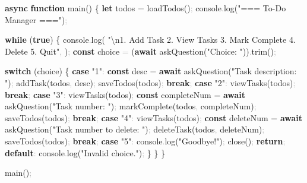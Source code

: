 \documentclass[
  justified,
  openright,
]{tufte-book}
\newcommand{\KeywordTok}[1]{\textcolor{CodeKeyword}{\textbf{#1}}}  %
\newcommand{\StringTok}[1]{\textcolor{CodeString}{#1}}              %
\newcommand{\CodeFuncTok}[1]{\textcolor{CodeKeyword}{#1}}           %
\newcommand{\OperatorTok}[1]{\textcolor{DarkGray}{#1}}              %
\newenvironment{Shaded}{%
  \begin{mdframed}[style=TufteCode]%
}{%
  \end{mdframed}%
}
\begin{document}
\begin{Shaded}
\begin{Highlighting}[]
\KeywordTok{async} \KeywordTok{function} \CodeFuncTok{main}() \{
  \KeywordTok{let} todos \OperatorTok{=} \CodeFuncTok{loadTodos}()\OperatorTok{;}
  console\OperatorTok{.}\CodeFuncTok{log}(\StringTok{"=== To{-}Do Manager ==="})\OperatorTok{;}
 
  \KeywordTok{while} (\KeywordTok{true}) \{
    console\OperatorTok{.}\CodeFuncTok{log}(
      \StringTok{"}\StringTok{\textbackslash{}n}\StringTok{1. Add Task  2. View Tasks  3. Mark Complete  4. Delete  5. Quit"}\OperatorTok{,}
    )\OperatorTok{;}
    \KeywordTok{const} choice \OperatorTok{=} (\KeywordTok{await} \CodeFuncTok{askQuestion}(\StringTok{"Choice: "}))\OperatorTok{.}\CodeFuncTok{trim}()\OperatorTok{;}
 
    \KeywordTok{switch} (choice) \{
      \KeywordTok{case} \StringTok{"1"}\OperatorTok{:}
        \KeywordTok{const} desc \OperatorTok{=} \KeywordTok{await} \CodeFuncTok{askQuestion}(\StringTok{"Task description: "})\OperatorTok{;}
        \CodeFuncTok{addTask}(todos\OperatorTok{,} desc)\OperatorTok{;}
        \CodeFuncTok{saveTodos}(todos)\OperatorTok{;}
        \KeywordTok{break}\OperatorTok{;}
      \KeywordTok{case} \StringTok{"2"}\OperatorTok{:}
        \CodeFuncTok{viewTasks}(todos)\OperatorTok{;}
        \KeywordTok{break}\OperatorTok{;}
      \KeywordTok{case} \StringTok{"3"}\OperatorTok{:}
        \CodeFuncTok{viewTasks}(todos)\OperatorTok{;}
        \KeywordTok{const} completeNum \OperatorTok{=} \KeywordTok{await} \CodeFuncTok{askQuestion}(\StringTok{"Task number: "})\OperatorTok{;}
        \CodeFuncTok{markComplete}(todos\OperatorTok{,} completeNum)\OperatorTok{;}
        \CodeFuncTok{saveTodos}(todos)\OperatorTok{;}
        \KeywordTok{break}\OperatorTok{;}
      \KeywordTok{case} \StringTok{"4"}\OperatorTok{:}
        \CodeFuncTok{viewTasks}(todos)\OperatorTok{;}
        \KeywordTok{const} deleteNum \OperatorTok{=} \KeywordTok{await} \CodeFuncTok{askQuestion}(\StringTok{"Task number to delete: "})\OperatorTok{;}
        \CodeFuncTok{deleteTask}(todos\OperatorTok{,} deleteNum)\OperatorTok{;}
        \CodeFuncTok{saveTodos}(todos)\OperatorTok{;}
        \KeywordTok{break}\OperatorTok{;}
      \KeywordTok{case} \StringTok{"5"}\OperatorTok{:}
        console\OperatorTok{.}\CodeFuncTok{log}(\StringTok{"Goodbye!"})\OperatorTok{;}
        \CodeFuncTok{close}()\OperatorTok{;}
        \KeywordTok{return}\OperatorTok{;}
      \KeywordTok{default}\OperatorTok{:}
        console\OperatorTok{.}\CodeFuncTok{log}(\StringTok{"Invalid choice."})\OperatorTok{;}
    \}
  \}
\}
 
\CodeFuncTok{main}()\OperatorTok{;}
\end{Highlighting}
\end{Shaded}
\end{document}
